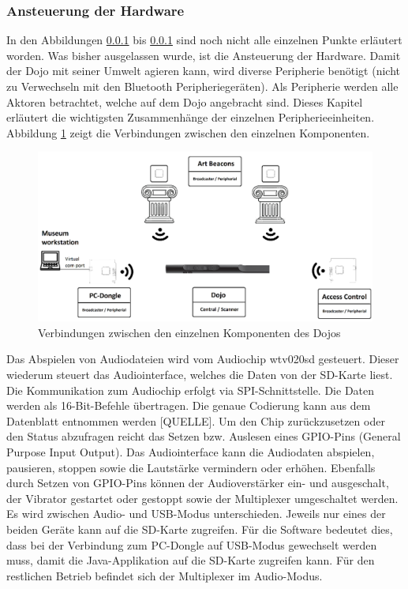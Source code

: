 \subsubsection{Ansteuerung der Hardware }
In den Abbildungen \ref{} bis \ref{} sind noch nicht alle einzelnen Punkte erläutert worden. Was bisher ausgelassen wurde, ist die Ansteuerung der Hardware. Damit der Dojo mit seiner Umwelt agieren kann, wird diverse Peripherie benötigt (nicht zu Verwechseln mit den Bluetooth Peripheriegeräten). Als Peripherie werden alle Aktoren betrachtet, welche auf dem Dojo angebracht sind. Dieses Kapitel erläutert die wichtigsten Zusammenhänge der einzelnen Peripherieeinheiten. Abbildung \ref{fig:soft_4} zeigt die Verbindungen zwischen den einzelnen Komponenten.
\begin{figure}[h]
	\centering
	\includegraphics[width=\textwidth]{graphics/platzhalter.png}
	\caption{Verbindungen zwischen den einzelnen Komponenten des Dojos}
	\label{fig:soft_4}
\end{figure}
Das Abspielen von Audiodateien wird vom Audiochip wtv020sd gesteuert. Dieser wiederum steuert das Audiointerface, welches die Daten von der SD-Karte liest. Die Kommunikation zum Audiochip erfolgt via SPI-Schnittstelle. Die Daten werden als 16-Bit-Befehle übertragen. Die genaue Codierung kann aus dem Datenblatt entnommen werden [QUELLE]. Um den Chip zurückzusetzen oder den Status abzufragen reicht das Setzen bzw. Auslesen eines GPIO-Pins (General Purpose Input Output). Das Audiointerface kann die Audiodaten abspielen, pausieren, stoppen sowie die Lautstärke vermindern oder erhöhen. 
Ebenfalls durch Setzen von GPIO-Pins können der Audioverstärker ein- und ausgeschalt, der Vibrator gestartet oder gestoppt sowie der Multiplexer umgeschaltet werden. Es wird zwischen Audio- und USB-Modus unterschieden. Jeweils nur eines der beiden Geräte kann auf die SD-Karte zugreifen. Für die Software bedeutet dies, dass bei der Verbindung zum PC-Dongle auf USB-Modus gewechselt werden muss, damit die Java-Applikation auf die SD-Karte zugreifen kann. Für den restlichen Betrieb befindet sich der Multiplexer im Audio-Modus.
